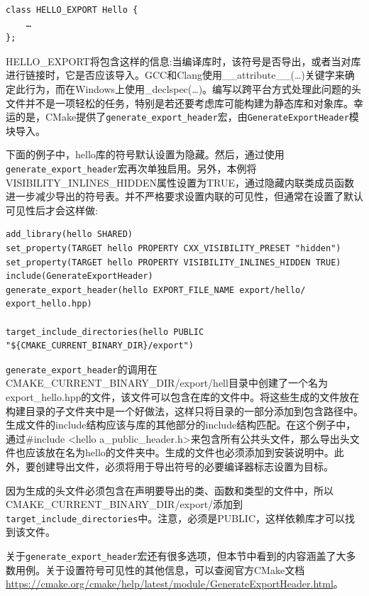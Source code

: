 \begin{lstlisting}[style=styleCXX]
class HELLO_EXPORT Hello {
	…
};
\end{lstlisting}

HELLO\_EXPORT将包含这样的信息:当编译库时，该符号是否导出，或者当对库进行链接时，它是否应该导入。GCC和Clang使用\_\_attribute\_\_(…)关键字来确定此行为，而在Windows上使用\_declspec(…)。编写以跨平台方式处理此问题的头文件并不是一项轻松的任务，特别是若还要考虑库可能构建为静态库和对象库。幸运的是，CMake提供了\texttt{generate\_export\_header}宏，由\texttt{GenerateExportHeader}模块导入。

下面的例子中，hello库的符号默认设置为隐藏。然后，通过使用\texttt{generate\_export\_header}宏再次单独启用。另外，本例将VISIBILITY\_INLINES\_HIDDEN属性设置为TRUE，通过隐藏内联类成员函数进一步减少导出的符号表。并不严格要求设置内联的可见性，但通常在设置了默认可见性后才会这样做:

\begin{lstlisting}[style=styleCMake]
add_library(hello SHARED)
set_property(TARGET hello PROPERTY CXX_VISIBILITY_PRESET "hidden")
set_property(TARGET hello PROPERTY VISIBILITY_INLINES_HIDDEN TRUE)
include(GenerateExportHeader)
generate_export_header(hello EXPORT_FILE_NAME export/hello/	export_hello.hpp)

target_include_directories(hello PUBLIC "${CMAKE_CURRENT_BINARY_DIR}/export")
\end{lstlisting}

\texttt{generate\_export\_header}的调用在CMAKE\_CURRENT\_BINARY\_DIR/export/hell目录中创建了一个名为export\_hello.hpp的文件，该文件可以包含在库的文件中。将这些生成的文件放在构建目录的子文件夹中是一个好做法，这样只将目录的一部分添加到包含路径中。生成文件的include结构应该与库的其他部分的include结构匹配。在这个例子中，通过\#include <hello a\_public\_header.h>来包含所有公共头文件，那么导出头文件也应该放在名为hello的文件夹中。生成的文件也必须添加到安装说明中。此外，要创建导出文件，必须将用于导出符号的必要编译器标志设置为目标。

因为生成的头文件必须包含在声明要导出的类、函数和类型的文件中，所以CMAKE\_CURRENT\_BINARY\_DIR/export/添加到\texttt{target\_include\_directories}中。注意，必须是PUBLIC，这样依赖库才可以找到该文件。

关于\texttt{generate\_export\_header}宏还有很多选项，但本节中看到的内容涵盖了大多数用例。关于设置符号可见性的其他信息，可以查阅官方CMake文档\url{https://cmake.org/cmake/help/latest/module/GenerateExportHeader.html}。


